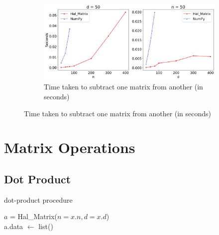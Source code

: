 \documentclass[11pt,twocolumn]{article}
\begin{document}
\begin{figure}[h]
\begin{subfigure}{0.45\textwidth}
        \label{img:mul}
    \end{subfigure}
    \begin{subfigure}{0.45\textwidth}
        \includegraphics[width=\linewidth]{graphs/sub2.png}
        \caption{Time taken to subtract one matrix from another (in seconds)}
        \label{img:sub}
    \end{subfigure}
    \label{img:comparision}
\end{figure}


\section{Matrix Operations}

    \subsection{Dot Product}

        \begin{algorithm}[!h]
            \caption{dot-product procedure}
            \SetAlgoLined

            $a$ = Hal\_Matrix($n=x.n, d=x.d$)\\
            a.data $\leftarrow$ list() \\
        \end{algorithm}
\end{document}
